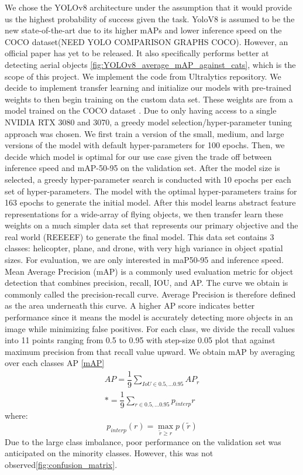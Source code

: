 \documentclass[10pt,twocolumn,letterpaper]{article}
\begin{document}
We chose the YOLOv8 architecture under the assumption that it would provide us the highest probability of success given the task. YoloV8 is 
assumed to be the new state-of-the-art due to its higher mAPs and lower inference speed on the COCO dataset(NEED YOLO COMPARISON GRAPHS COCO). However, an official paper has 
yet to be released. It also specifically performs better at detecting aerial objects \ref{fig:YOLOv8_average_mAP_against_cats}, which is the scope of this project. We implement the code
from Ultralytics repository. We decide to implement transfer learning and initialize our models with pre-trained weights to then begin training on the 
custom data set. These weights are from a model trained on the COCO dataset \cite{coco}. Due to only having access to a single NVIDIA RTX 3080 and 3070, 
a greedy model selection/hyper-parameter tuning approach was chosen. We first train a version of the small, medium, and large versions of the 
model with default hyper-parameters for 100 epochs. Then, we decide which model is optimal for our use case given the trade off between inference 
speed and mAP-50-95 on the validation set. After the model size is selected, a greedy hyper-parameter search is conducted with 10 epochs per each 
set of hyper-parameters. The model with the optimal hyper-parameters trains for 163 epochs to generate the initial model. After this model learns abstract feature representations for a wide-array of flying objects, we then transfer learn these weights on a much simpler data set that represents our primary objective and the real world (REEEEF) to generate the final model. This data set contains 3 classes: helicopter, plane, and drone, with very high variance in object spatial sizes. For evaluation, we are only interested in maP50-95 and inference speed.
Mean Average Precision (mAP) is a commonly used evaluation metric for object detection that combines precision, recall, IOU, and AP. The curve we obtain is commonly called the precision-recall curve. Average Precision is therefore defined as the area underneath this curve. A higher AP score indicates better performance since it means the model is accurately detecting more objects in an image while minimizing false positives.
For each class, we divide the recall values into 11 points ranging from 0.5 to 0.95 with step-size 0.05 plot that against maximum precision from that recall value upward. We obtain mAP by averaging over each classes AP \ref{mAP}\\ 

\begin{align}\label{mAP}
AP=\dfrac{1}{9}\sum_{IoU\in{0.5,...0.95}}AP_r \\*
=\dfrac{1}{9}\sum_{r\in{0.5,...0.95}}p_{interp}{r}
\end{align}
where:
\begin{equation*}
p_{interp}({r}) = \max_{\widetilde{r}\geq{r}} p(\widetilde{r})
\end{equation*}
Due to the large class imbalance, poor performance on the validation set was anticipated on the minority classes. However, this was not observed\ref{fig:confusion_matrix}.
\end{document}
